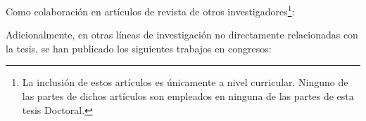 Como colaboración en artículos de revista de otros investigadores\footnote{La inclusión de estos artículos es únicamente a nivel curricular. Ninguno de las partes de dichos artículos son empleados en ninguna de las partes de esta tesis Doctoral.}:

\begin{refsection}[jcrNONO]
    \setlength{\biblabelsep}{0pt}
    \small
    \nocite{*} %
    \printbibliography[heading=none]
\end{refsection}

Adicionalmente, en otras líneas de investigación no directamente relacionadas con la tesis, se han publicado los siguientes trabajos en congresos:

\begin{refsection}[congresosNO]
    \setlength{\biblabelsep}{0pt}
    \small
    \nocite{*} %
    \printbibliography[heading=none]
\end{refsection}

